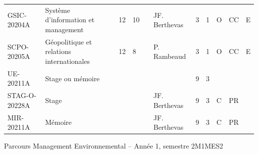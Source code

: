 \documentclass[a4paper,11pt]{article}
\begin{document}
{{\begin{tabular}{lllllllllll}
GSIC-20204A   & Système d'information et management                               & 12 & 10 &    & JF. Berthevas   & 3    & 1    & O           & CC             & E         \\
SCPO-20205A   & Géopolitique et relations internationales                         & 12 & 8  &    & P. Rambeaud     & 3    & 1    & O           & CC             & E         \\
\rowcolor[HTML]{C0C0C0} 
UE-20211A     & Stage ou mémoire                                                  &    &    &    &                 & 9    & 3    &             &                &           \\
STAG-O-20228A & Stage                                                             &    &    &    & JF. Berthevas   & 9    & 3    & C           & PR             &           \\
MIR-20211A    & Mémoire                                                           &    &    &    & JF. Berthevas   & 9    & 3    & C           & PR             &           
\end{tabular}}
}{Parcours Management Environnemental -- Année 1, semestre 2}{M1MES2}
\end{document}
